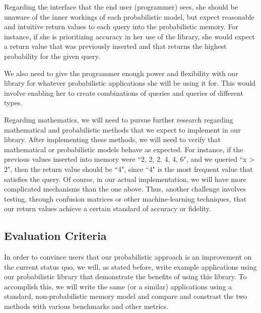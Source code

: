 \documentclass{sig-alternate}
\begin{document}
Regarding the interface that the end user (programmer) sees, she should be unaware of 
the inner workings of each probabilistic model, but expect reasonable and intuitive return values
to each query into the probabilistic memory. For instance, if she is prioritizing accuracy 
in her use of the library, she would expect a return value that was previously inserted and that 
returns the highest probability for the given query.

We also need to give the programmer enough power and flexibility with our library for 
whatever probabilistic applications she will be using it for. This would involve enabling 
her to create combinations of queries and queries of different types.

Regarding mathematics, we will need to pursue further research regarding mathematical 
and probabilistic methods that we expect to implement in our library. After implementing these methods,
we will need to verify that mathematical or probabilistic models behave as expected. 
For instance, if the previous values inserted into memory were ``2, 2, 2, 4, 4, 6", and we queried ``x > 2", 
then the return value should be ``4", since ``4" is the most frequent value that satisfies the query.
Of course, in our actual implementation, we will have more complicated mechanisms than the one above.
Thus, another challenge involves testing, through confusion matrices or other machine-learning techniques,
that our return values achieve a certain standard of accuracy or fidelity.


\subsection{Evaluation Criteria}
\label{subsec:eval_criteria}
In order to convince users that our probabilistic approach is an improvement on the
current status quo, we will, as stated before, write example applications using our 
probabilistic library that demonstrate the benefits of using this library. To accomplish 
this, we will write the same (or a similar) applications using a standard, non-probabilistic memory model
and compare and constrast the two methods with various benchmarks and other metrics.
\end{document}
